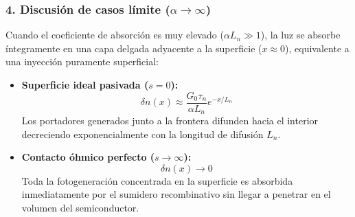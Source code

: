 \begin{problema}
\subsubsection*{4. Discusión de casos límite ($\alpha \to \infty$)}
Cuando el coeficiente de absorción es muy elevado ($\alpha L_n \gg 1$), la luz se absorbe íntegramente en una capa delgada adyacente a la superficie ($x \approx 0$), equivalente a una inyección puramente superficial:
\begin{itemize}
    \item \textbf{Superficie ideal pasivada ($s = 0$):}
    \[
    \delta n(x) \approx \frac{G_0 \tau_n}{\alpha L_n} e^{-x/L_n}
    \]
    Los portadores generados junto a la frontera difunden hacia el interior decreciendo exponencialmente con la longitud de difusión $L_n$.

    \item \textbf{Contacto óhmico perfecto ($s \to \infty$):}
    \[
    \delta n(x) \to 0
    \]
    Toda la fotogeneración concentrada en la superficie es absorbida inmediatamente por el sumidero recombinativo sin llegar a penetrar en el volumen del semiconductor.
\end{itemize}
\end{problema}

